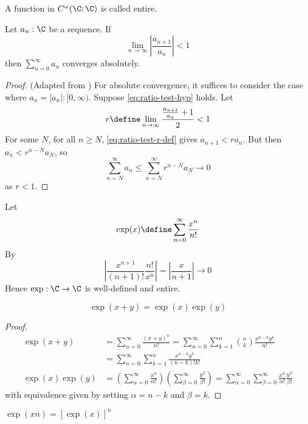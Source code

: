 \documentclass[10pt]{scrartcl}
\begin{document}
\begin{defn}
  A function in $C^\omega(\C;\C)$ is called entire. 
\end{defn}

\begin{lemma}
  \label{ratio-test}
  Let $a_n:\C$ be a sequence. If
  \begin{equation}
    \label{eq:ratio-test-hyp}
    \lim_{n\to \infty} \left|\frac{a_{n+1}}{a_n}\right| <1
  \end{equation}
  then $\sum_{n=0}^\infty a_n$ converges absolutely.
  \cite{wiki:ratio-test}
\end{lemma}
\begin{proof}
  (Adapted from \cite{wiki:ratio-test})
  For absolute convergence, it suffices to consider the case where $a_n = |a_n|:[0,\infty)$. Suppose \cref{eq:ratio-test-hyp} holds. Let
  \begin{equation}
    \label{eq:ratio-test-r-def}
  r\define \lim_{n\to \infty} \frac{\frac{a_{n+1}}{a_n} +1}{2}<1
  \end{equation}
  For some $N$, for all $n\geq N$, \cref{eq:ratio-test-r-def} gives $a_{n+1}<r a_n$. But then $a_{n}<r^{n-N}a_N$, so
  \[
  \sum_{n=N}^\infty a_n \leq \sum_{n=N}^\infty r^{n-N}a_N\to 0
  \]
  as $r<1$. 
\end{proof}

\begin{defn}[$\exp$]
  Let
  \[
  \exp(x) \define \sum_{n=0}^\infty \frac{x^n}{n!}
  \]
  By 
  \[
  \left |\frac {x^{n+1}}{(n+1)!}\frac{n!}{x^n} \right|=\left|\frac x {n+1} \right|\to 0
  \]
  Hence $\exp:\C\to\C$ is well-defined and entire.  
\end{defn}

\begin{lemma}
  \[
  \exp(x+y)=\exp(x)\exp(y)
  \]
\end{lemma}
\begin{proof}
  \begin{align*}
    \exp(x+y)&=\sum_{n=0}^\infty \frac{(x+y)^n}{n!}
             =\sum_{n=0}^\infty  \sum_{k=1}^n  {n \choose k} \frac{x^{n-k}y^k}{n!} \\
             &=\sum_{n=0}^\infty  \sum_{k=1}^n  \frac{x^{n-k}y^k}{(n-k)!k!} \\ 
    \exp(x)\exp(y)&=\left(\sum_{\alpha=0}^\infty \frac{x^\alpha}{\alpha!} \right)\left(\sum_{\beta=0}^\infty \frac{y^\beta}{\beta!}\right) =\sum_{\alpha=0}^\infty\sum_{\beta=0}^\infty \frac{x^\alpha}{\alpha!}\frac{y^\beta}{\beta!}
  \end{align*}
  with equivalence given by setting $\alpha=n-k$ and $\beta=k$.
\end{proof}
\begin{cor}
  $\exp(xn)=[\exp(x)]^n$
\end{cor}
\end{document}
